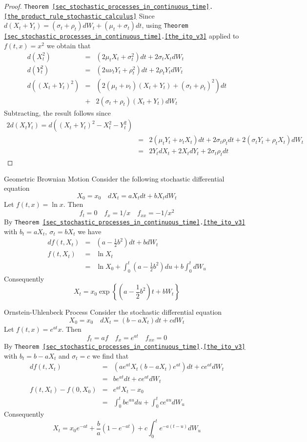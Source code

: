 \documentclass[11pt,a4paper]{article}
\begin{document}
  \begin{proof}{\texttt{Theorem \ref{sec_stochastic_processes_in_continuous_time}.\ref{the_product_rule_stochastic_calculus}}}
    Since $d(X_t+Y_t)=(\sigma_t+\rho_t)dW_t+(\mu_t+\sigma_t)dt$, using \texttt{Theorem \ref{sec_stochastic_processes_in_continuous_time}.\ref{the_ito_v3}} applied to $f(t,x)=x^2$ we obtain that
    \[\begin{array}{rcl}
      d(X_t^2)&=&(2\mu_tX_t+\sigma_t^2)dt+2\sigma_tX_tdW_t\\
      d(Y_t^2)&=&(2u\nu_tY_t+\rho_t^2)dt+2\rho_tY_tdW_t\\
      d((X_t+Y_t)^2)&=&(2(\mu_t+\nu_t)(X_t+Y_t)+(\sigma_t+\rho_t)^2)dt\\
      &+&2(\sigma_t+\rho_t)(X_t+Y_t)dW_t
    \end{array}\]
    Subtracting, the result follows since
    \[\begin{array}{rcl}
      2d(X_tY_t)=d((X_t+Y_t)^2-X_t^2-Y_t^2)\\
      &=&2(\mu_tY_t+\nu_tX_t)dt+2\sigma_t\rho_tdt+2(\sigma_tY_t+\rho_tX_t)dW_t\\
      &=&2Y_tdX_t+2X_tdY_t+2\sigma_t\rho_tdt
    \end{array}\]
  \end{proof}

  \begin{example}{Geometric Brownian Motion}
    Consider the following stochastic differential equation
    \[ X_0=x_0\quad dX_t=aX_tdt+bX_tdW_t \]
    Let $f(t,x)=\ln x$. Then
    \[ f_t=0\quad f_x=1/x\quad f_{xx}=-1/x^2 \]
    By \texttt{Theorem \ref{sec_stochastic_processes_in_continuous_time}.\ref{the_ito_v3}} with $b_t=aX_t,\ \sigma_t=bX_t$ we have
    \[\begin{array}{rcl}
      df(t,X_t)&=&\left(a-\frac12b^2\right)dt+bdW_t\\
      f(t,X_t)&=&\ln X_t\\
      &=&\ln X_0+\int_0^t\left(a-\frac12b^2\right)du+b\int_0^tdW_u
    \end{array}\]
    Consequently
    \[ X_t=x_0\exp\left\{\left(a-\frac12b^2\right)t+bW_t\right\} \]
  \end{example}

  \begin{example}{Ornstein-Uhlenbeck Process}
    Consider the stochastic differential equation
    \[ X_0=x_0\quad dX_t=(b-aX_t)dt+cdW_t \]
    Let $f(t,x)=e^{at}x$. Then
    \[ f_t=af\quad f_x=e^{at}\quad f_{xx}=0 \]
    By \texttt{Theorem \ref{sec_stochastic_processes_in_continuous_time}.\ref{the_ito_v3}} with $b_t=b-aX_t$ and $\sigma_t=c$ we find that
    \[\begin{array}{rcl}
      df(t,X_t)&=&\left(ae^{at}X_t(b-aX_t)e^{at}\right)dt+ce^{at}dW_t\\
      &=&be^{at}dt+ce^{at}dW_t\\
      f(t,X_t)-f(0,X_0)&=&e^{at}X_t-x_0\\
      &=&\int_0^tbe^{au}du+\int_0^tce^{au}dW_u
    \end{array}\]
    Consequently
    \[ X_t=x_0e^{-at}+\frac{b}a\left(1-e^{-at}\right)+c\int_0^te^{-a(t-u)}dW_u \]
  \end{example}
\end{document}
